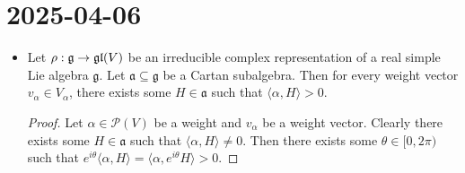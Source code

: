 \documentclass{report}
\begin{document}
\section{2025-04-06}
\begin{itemize}
    \item
    \begin{lemma}
        Let $\rho: \mathfrak g \to \operatorname{{\mathfrak{gl}}}(V)$ be an irreducible complex representation of a real simple Lie algebra $\mathfrak g$.
        Let $\mathfrak a \subseteq \mathfrak g$ be a Cartan subalgebra.
        Then for every weight vector $v_\alpha \in V_\alpha$, there exists some $H \in \mathfrak a$ such that $\langle \alpha, H \rangle > 0$.
    \end{lemma}
    \begin{proof}
        Let $\alpha \in \mathcal P(V)$ be a weight and $v_\alpha$ be a weight vector.
        Clearly there exists some $H \in \mathfrak a$ such that $\langle \alpha, H \rangle \neq 0$.
        Then there exists some $\theta \in [0, 2\pi)$ such that $e^{i \theta} \langle \alpha, H \rangle = \langle \alpha, e^{i \theta} H \rangle > 0$.
    \end{proof}
\end{itemize}
\end{document}
